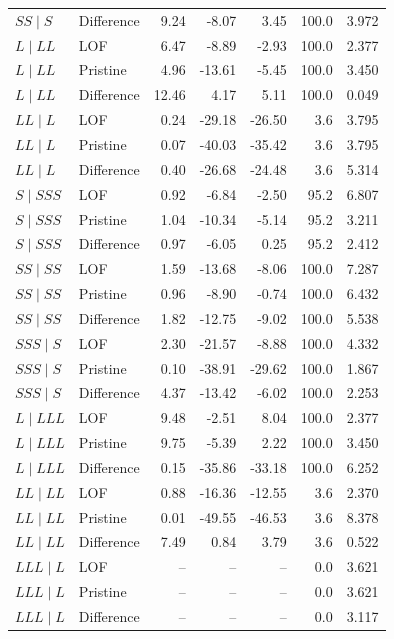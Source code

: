 \documentclass[11pt]{article}
\begin{document}
{\begin{longtable}{@{}llrrrrr@{}}
$SS\mid S$ & Difference & 9.24 & -8.07 & 3.45 & 100.0 & 3.972 \\
\addlinespace
$L\mid LL$ & LOF & 6.47 & -8.89 & -2.93 & 100.0 & 2.377 \\
$L\mid LL$ & Pristine & 4.96 & -13.61 & -5.45 & 100.0 & 3.450 \\
$L\mid LL$ & Difference & 12.46 & 4.17 & 5.11 & 100.0 & 0.049 \\
\addlinespace
$LL\mid L$ & LOF & 0.24 & -29.18 & -26.50 & 3.6 & 3.795 \\
$LL\mid L$ & Pristine & 0.07 & -40.03 & -35.42 & 3.6 & 3.795 \\
$LL\mid L$ & Difference & 0.40 & -26.68 & -24.48 & 3.6 & 5.314 \\
\addlinespace
$S\mid SSS$ & LOF & 0.92 & -6.84 & -2.50 & 95.2 & 6.807 \\
$S\mid SSS$ & Pristine & 1.04 & -10.34 & -5.14 & 95.2 & 3.211 \\
$S\mid SSS$ & Difference & 0.97 & -6.05 & 0.25 & 95.2 & 2.412 \\
\addlinespace
$SS\mid SS$ & LOF & 1.59 & -13.68 & -8.06 & 100.0 & 7.287 \\
$SS\mid SS$ & Pristine & 0.96 & -8.90 & -0.74 & 100.0 & 6.432 \\
$SS\mid SS$ & Difference & 1.82 & -12.75 & -9.02 & 100.0 & 5.538 \\
\addlinespace
$SSS\mid S$ & LOF & 2.30 & -21.57 & -8.88 & 100.0 & 4.332 \\
$SSS\mid S$ & Pristine & 0.10 & -38.91 & -29.62 & 100.0 & 1.867 \\
$SSS\mid S$ & Difference & 4.37 & -13.42 & -6.02 & 100.0 & 2.253 \\
\addlinespace
$L\mid LLL$ & LOF & 9.48 & -2.51 & 8.04 & 100.0 & 2.377 \\
$L\mid LLL$ & Pristine & 9.75 & -5.39 & 2.22 & 100.0 & 3.450 \\
$L\mid LLL$ & Difference & 0.15 & -35.86 & -33.18 & 100.0 & 6.252 \\
\addlinespace
$LL\mid LL$ & LOF & 0.88 & -16.36 & -12.55 & 3.6 & 2.370 \\
$LL\mid LL$ & Pristine & 0.01 & -49.55 & -46.53 & 3.6 & 8.378 \\
$LL\mid LL$ & Difference & 7.49 & 0.84 & 3.79 & 3.6 & 0.522 \\
\addlinespace
$LLL\mid L$ & LOF & -- & -- & -- & 0.0 & 3.621 \\
$LLL\mid L$ & Pristine & -- & -- & -- & 0.0 & 3.621 \\
$LLL\mid L$ & Difference & -- & -- & -- & 0.0 & 3.117 \\

\end{longtable}}
\end{document}

